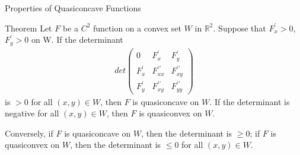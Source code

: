 \documentclass{beamer}
\begin{document}
\begin{frame}{Properties of Quasiconcave Functions}
\begin{block}{Theorem}
Let $F$ be a $C^2$ function on a convex set $W$ in $\mathbb{R}^2$. Suppose that $F_x^\prime>0$, $F_y^\prime>0$ on W. If the determinant 
\begin{align*}
    det\begin{pmatrix} 0& F_x^\prime & F_y^\prime \\
     F_x^\prime & F_{xx}^{\prime \prime} & F_{xy}^{\prime \prime} \\
     F_y^\prime & F_{xy}^{\prime \prime} & F_{yy}^{\prime \prime} 
    \end{pmatrix}
\end{align*}
is $>0$ for all $(x,y)\in W$, then $F$ is quasiconcave on $W$. If the determinant is negative for all $(x,y)\in W$, then $F$ is quasiconvex on $W$.
\par Conversely, if $F$ is quasiconcave on $W$, then the determinant is $\geq 0$; if $F$ is quasiconvex on $W$, then the determinant is $\leq 0$ for all $(x,y)\in W$.
\end{block}

\end{frame}
\end{document}

